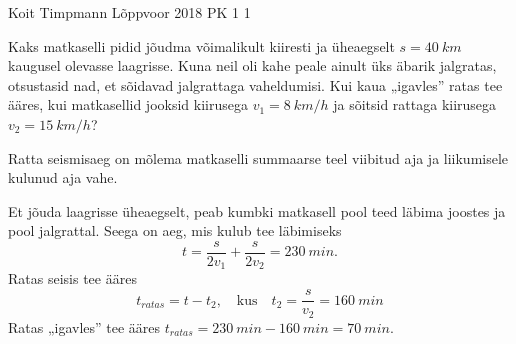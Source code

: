 {Koit Timpmann}
{Lõppvoor}
{2018}
{PK 1} %
{1} %
{
\ifStatement

    Kaks matkaselli pidid jõudma võimalikult kiiresti ja üheaegselt $s = \SI{40}{km}$ kaugusel olevasse laagrisse. Kuna neil oli kahe peale ainult üks äbarik jalgratas, otsustasid nad, et sõidavad jalgrattaga vaheldumisi. Kui kaua „igavles'' ratas tee ääres, kui matkasellid jooksid kiirusega $v_1 = \SI{8}{km/h}$ ja sõitsid rattaga kiirusega $v_2 = \SI{15}{km/h}$?


\fi


\ifHint

Ratta seismisaeg on mõlema matkaselli summaarse teel viibitud aja ja liikumisele kulunud aja vahe.

\fi


\ifSolution

Et jõuda laagrisse üheaegselt, peab kumbki matkasell pool teed läbima joostes ja pool jalgrattal. Seega on aeg, mis kulub tee läbimiseks
\[ t = \frac{s}{2v_1}+\frac{s}{2v_2} = \SI{230}{min}. \]
Ratas seisis tee ääres
\[ t_{ratas} = t-t_2,\quad \text{kus}\quad t_2=\frac{s}{v_2} = \SI{160}{min} \]
Ratas „igavles'' tee ääres $t_{ratas} = \SI{230}{min} - \SI{160}{min} = \SI{70}{min}.$

\fi
}